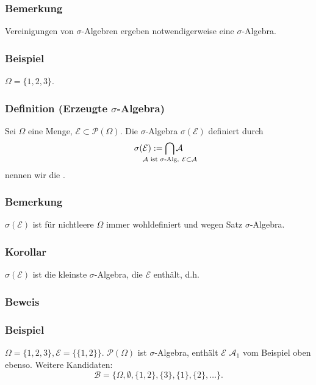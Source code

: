 \subsubsection{Bemerkung}
Vereinigungen von $\sigma$-Algebren ergeben  notwendigerweise eine $\sigma$-Algebra.
\subsubsection{Beispiel}
$\Omega=\{1,2,3\}$.
\subsubsection{Definition (Erzeugte $\sigma$-Algebra)}
Sei $\Omega$ eine Menge, $\mathcal{E}\subset\mathcal{P}(\Omega)$. Die $\sigma$-Algebra $\sigma(\mathcal{E})$ definiert durch
\[
\sigma(\mathcal{E}):=\bigcap_{\mathclap{\mathcal{A}\text{ ist $\sigma$-Alg},\ \mathcal{E}\subset\mathcal{A}}}\mathcal{A}
\]
nennen wir die .
\subsubsection{Bemerkung}
$\sigma(\mathcal{E})$ ist f\"ur nichtleere $\Omega$ immer wohldefiniert und wegen Satz $\sigma$-Algebra.
\subsubsection{Korollar}
$\sigma(\mathcal{E})$ ist die kleinste $\sigma$-Algebra, die $\mathcal{E}$ enth\"alt, d.h.
\subsubsection{Beweis}
\subsubsection{Beispiel}
$\Omega=\{1,2,3\},\mathcal{E}=\{\{1,2\}\}$. $\mathcal{P}(\Omega)$ ist $\sigma$-Algebra, enth\"alt $\mathcal{E}$ $\mathcal{A}_1$ vom Beispiel oben ebenso. Weitere Kandidaten:
\[
\mathcal{B}=\{\Omega,\emptyset,\{1,2\},\{3\},\{1\},\{2\},\ldots\}.
\]

